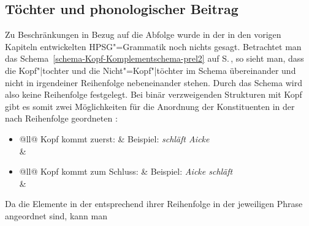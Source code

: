 \subsection{Töchter und phonologischer Beitrag}

Zu Beschränkungen in Bezug auf die Abfolge wurde in der in den vorigen Kapiteln entwickelten
HPSG"=Grammatik noch nichts gesagt. Betrachtet man das
Schema~\ref{schema-Kopf-Komplementschema-prel2} auf S.\,\pageref{schema-Kopf-Komplementschema-prel2}, so sieht man,
dass die Kopf"|tochter und die Nicht"=Kopf"|töchter im Schema übereinander und nicht in irgendeiner
Reihenfolge nebeneinander stehen. Durch das Schema wird also keine Reihenfolge festgelegt. Bei binär
verzweigenden Strukturen mit Kopf gibt es somit zwei Möglichkeiten für die Anordnung der
Konstituenten in der nach Reihenfolge geordneten \dtrsl:
\begin{itemize}
\item \begin{tabular}[t]{@{}ll@{}}
Kopf kommt zuerst:                                   & Beispiel: \emph{schläft Aicke}\\
%
&%
\\
\end{tabular}
\item \begin{tabular}[t]{@{}ll@{}}
Kopf kommt zum Schluss:                            & Beispiel: \emph{Aicke schläft}\\
%
&%
\\
\end{tabular}
\end{itemize}
Da die Elemente in der \dtrsl entsprechend ihrer Reihenfolge in der jeweiligen Phrase angeordnet sind, kann man
